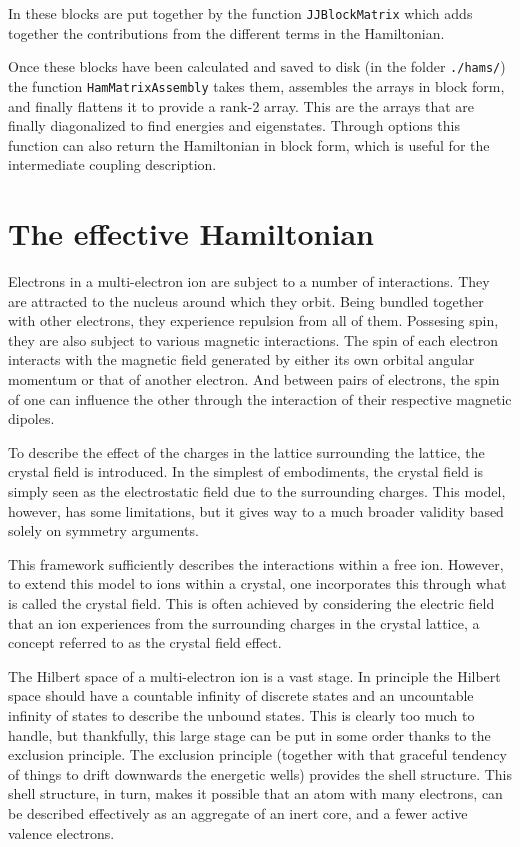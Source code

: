 \documentclass{article}
\newcommand{\codetext}[1]{{\color{BlueViolet} \texttt{#1}}}
\begin{document}
In \qlanth these blocks are put together by the function \codetext{JJBlockMatrix} which adds together the contributions from the different terms in the Hamiltonian.



Once these blocks have been calculated and saved to disk (in the folder \codetext{./hams/}) the function \codetext{HamMatrixAssembly} takes them, assembles the arrays in block form, and finally flattens it to provide a rank-2 array. This are the arrays that are finally diagonalized to find energies and eigenstates. Through options this function can also return the Hamiltonian in block form, which is useful for the intermediate coupling description.



\section{The effective Hamiltonian} 

Electrons in a multi-electron ion are subject to a number of interactions. They are attracted to the nucleus around which they orbit. Being bundled together with other electrons, they experience repulsion from all of them. Possesing spin, they are also subject to various magnetic interactions. The spin of each electron interacts with the magnetic field generated by either its own orbital angular momentum or that of another electron. And between pairs of electrons, the spin of one can influence the other through the interaction of their respective magnetic dipoles.

To describe the effect of the charges in the lattice surrounding the lattice, the crystal field is introduced. In the simplest of embodiments, the crystal field is simply seen as the electrostatic field due to the surrounding charges. This model, however, has some limitations, but it gives way to a much broader validity based solely on symmetry arguments.

This framework sufficiently describes the interactions within a free ion. However, to extend this model to ions within a crystal, one incorporates this through what is called the crystal field. This is often achieved by considering the electric field that an ion experiences from the surrounding charges in the crystal lattice, a concept referred to as the crystal field effect.

The Hilbert space of a multi-electron ion is a vast stage. In principle the Hilbert space should have a countable infinity of discrete states and an uncountable infinity of states to describe the unbound states. This is clearly too much to handle, but thankfully, this large stage can be put in some order thanks to the exclusion principle. The exclusion principle (together with that graceful tendency of things to drift downwards the energetic wells) provides the shell structure. This shell structure, in turn, makes it possible that an atom with many electrons, can be described effectively as an aggregate of an inert core, and a fewer active valence electrons.  
\end{document}
